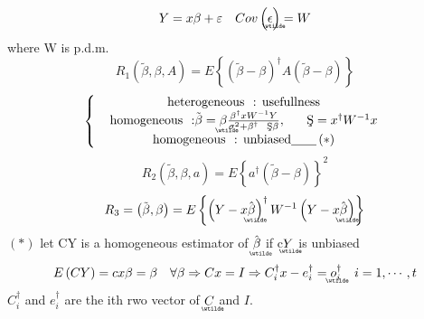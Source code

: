 \documentclass{article}
\begin{document}
\begin{equation*}
Y=x\beta +\varepsilon \quad Cov\left( 
\underaccent{\wtilde}{\epsilon}%
\right) =W
\end{equation*}%
where W is p.d.m.%
\begin{equation*}
R_{1}\left( \tilde{\beta},\beta ,A\right) =E\left\{ \left( \tilde{\beta}%
-\beta \right) ^{\dagger }A\left( \tilde{\beta}-\beta \right) \right\}
\end{equation*}%
\begin{equation*}
\left\{ 
\begin{array}{c}
\text{heterogeneous}\text{: usefullness} \\ 
\text{homogeneous}\text{:}\tilde{\beta}=%
\underaccent{\wtilde}{\beta}%
\frac{\beta ^{\dagger }xW^{-1}Y}{\sigma ^{2}+\beta ^{\dagger }\text{\c{S}}%
\beta },\text{\quad \c{S}}=x^{\dagger }W^{-1}x \\ 
\text{homogeneous}\text{: unbiased}\underline{\qquad }\left( \ast \right)%
\end{array}%
\right.
\end{equation*}%
\begin{equation*}
R_{2}\left( \tilde{\beta},\beta ,a\right) =E\left\{ a^{\dagger }\left( 
\tilde{\beta}-\beta \right) \right\} ^{2}
\end{equation*}%
\begin{equation*}
R_{3}=\left( \tilde{\beta},\beta \right) =E\left\{ \left( Y-x%
\underaccent{\wtilde}{\hat{\beta}}%
\right) ^{\dagger }W^{-1}\left( Y-x%
\underaccent{\wtilde}{\hat{\beta}}%
\right) \right\}
\end{equation*}%
$\left( \ast \right) $ let CY is a homogeneous estimator of $%
\underaccent{\wtilde}{\hat{\beta}}%
$ if c$%
\underaccent{\wtilde}{Y}%
$ is unbiased%
\begin{equation*}
E\left( CY\right) =cx\beta =\beta \quad \forall \beta \Rightarrow
Cx=I\Rightarrow C_{i}^{\dagger }x-e_{i}^{\dagger }=%
\underaccent{\wtilde}{o}%
_{i}^{\dagger }\quad i=1,\cdots ,t
\end{equation*}%
$C_{i}^{\dagger }$ and $e_{i}^{\dagger }$ are the ith rwo vector of $%
\underaccent{\wtilde}{C}%
$ and $I$.
\end{document}
